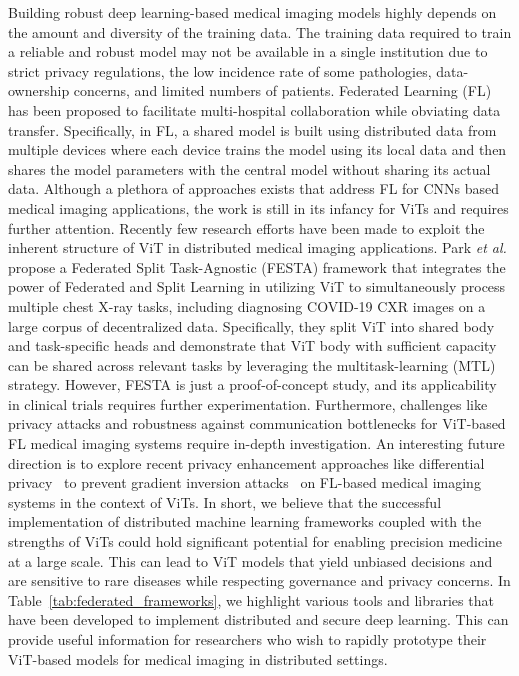 \documentclass[10pt,journal,compsoc]{IEEEtran}
\begin{document}
Building robust deep learning-based medical imaging models highly depends on the amount and diversity of the training data. The training data required to train a reliable and robust model may not be available in a single institution due to strict privacy regulations, the low incidence rate of some pathologies,  data-ownership concerns, and limited numbers of patients. Federated Learning (FL) has been proposed to facilitate multi-hospital collaboration while obviating data transfer. Specifically, in FL, a shared model is built using distributed data from multiple devices where each device trains the model using its local data and then shares the model parameters with the central model without sharing its actual data. Although a plethora of approaches exists that address FL for CNNs based medical imaging applications, the work is still in its infancy for ViTs and requires further attention. Recently few research efforts have been made to exploit the inherent structure of ViT in distributed medical imaging applications. Park \textit{et al.} \cite{park2021federated} propose a Federated Split Task-Agnostic (FESTA) framework that integrates the power of Federated and Split Learning \cite{yang2019federated,vepakomma2018split} in utilizing ViT to simultaneously process multiple chest X-ray tasks, including diagnosing COVID-19 CXR images on a large corpus of decentralized data. Specifically, they split ViT into shared body and task-specific heads and demonstrate that ViT body with sufficient capacity can be shared across relevant tasks by leveraging the multitask-learning (MTL) \cite{caruana1997multitask} strategy. 
However, FESTA is just a proof-of-concept study, and its applicability in clinical trials requires further experimentation. Furthermore, challenges like privacy attacks and robustness against communication bottlenecks for ViT-based FL medical imaging systems require in-depth investigation. An interesting future direction is to explore recent privacy enhancement approaches like differential privacy~\cite{abadi2016deep} to prevent gradient inversion attacks~\cite{huang2021evaluating} on FL-based medical imaging systems in the context of ViTs.
In short, we believe that the successful implementation of distributed machine learning frameworks coupled with the strengths of ViTs could hold significant potential for enabling precision medicine at a large scale. This can lead to ViT models that yield unbiased decisions and are sensitive to rare diseases while respecting governance and privacy concerns. In Table~\ref{tab:federated_frameworks}, we highlight various tools and libraries that have been developed to implement distributed and secure deep learning. This can provide useful information for researchers who wish to rapidly prototype their ViT-based models for medical imaging in distributed settings.
\end{document}
